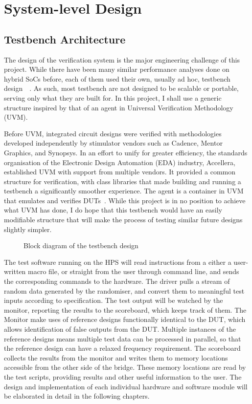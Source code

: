 \chapter{System-level Design}

\section{Testbench Architecture}
The design of the verification system is the major engineering challenge of this project.
While there have been many similar performance analyses done on hybrid SoCs before, each of them used their own, usually ad hoc, testbench design~\cite{Shi1}~\cite{Li1}.
As such, most testbench are not designed to be scalable or portable, serving only what they are built for.
In this project, I shall use a generic structure inspired by that of an agent in Universal Verification Methodology (UVM).

Before UVM, integrated circuit designs were verified with methodologies developed independently by stimulator vendors such as Cadence, Mentor Graphics, and Synopsys.
In an effort to unify for greater efficiency, the standards organisation of the Electronic Design Automation (EDA) industry, Accellera, established UVM with support from multiple vendors.
It provided a common structure for verification, with class libraries that made building and running a testbench a significantly smoother experience.
The agent is a container in UVM that emulates and verifies DUTs~\cite{Accellera1}.
While this project is in no position to achieve what UVM has done, I do hope that this testbench would have an easily modifiable structure that will make the process of testing similar future designs slightly simpler.

\begin{figure}[H]
  \centering
  
  \caption{Block diagram of the testbench design}
  \label{Block}
\end{figure}

The test software running on the HPS will read instructions from a either a user-written macro file, or straight from the user through command line, and sends the corresponding commands to the hardware.
The driver pulls a stream of random data generated by the randomiser, and convert them to meaningful test inputs according to specification.
The test output will be watched by the monitor, reporting the results to the scoreboard, which keeps track of them.
The Monitor make uses of reference designs functionally identical to the DUT, which allows identification of false outputs from the DUT.
Multiple instances of the reference designs means multiple test data can be processed in parallel, so that the reference design can have a relaxed frequency requirement.
The scoreboard collects the results from the monitor and writes them to memory locations accessible from the other side of the bridge.
These memory locations are read by the test scripts, providing results and other useful information to the user.
The design and implementation of each individual hardware and software module will be elaborated in detail in the following chapters.

